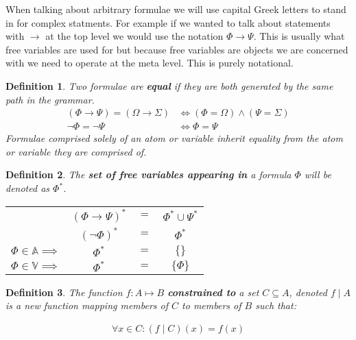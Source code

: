 \documentclass{article}
\newtheorem{defin}{Definition}
\begin{document}
When talking about arbitrary formulae we will use capital Greek letters to stand in for complex statments.
For example if we wanted to talk about statements with $\rightarrow$ at the top level we would use the notation $\Phi \rightarrow \Psi$.
This is usually what free variables are used for but because free variables are objects we are concerned with we need to operate at the meta level.
This is purely notational.

\begin{defin}
Two formulae are \textbf{equal} if they are both generated by the same path in the grammar.
\begin{align*}
(\Phi \rightarrow \Psi) = (\Omega \rightarrow \Sigma) &\iff (\Phi = \Omega) \land (\Psi = \Sigma) \\
\neg \Phi = \neg \Psi &\iff \Phi = \Psi
\end{align*}
Formulae comprised solely of an atom or variable inherit equality from the atom or variable they are comprised of.
\end{defin}

\begin{defin}
The \textbf{set of free variables appearing in} a formula $\Phi$ will be denoted as $\Phi^\ast$.
\setlength{\tabcolsep}{1pt}
\begin{center}
	\begin{tabular}{rclc}
		                               & $(\Phi \rightarrow \Psi)^\ast$ & $=$ & $ \Phi^\ast \cup \Psi^\ast$ \\
		                               & $(\neg \Phi)^\ast            $ & $=$ & $ \Phi^\ast               $ \\
		$\Phi \in \mathbb{A} \implies$ & $\Phi^\ast                   $ & $=$ & $ \{\}                    $ \\
		$\Phi \in \mathbb{V} \implies$ & $\Phi^\ast                   $ & $=$ & $ \{\Phi\}                $
	\end{tabular}
\end{center}
\end{defin}

\begin{defin}
The function $f : A \mapsto B$ \textbf{constrained to} a set $C \subseteq A$, denoted $f \mid A$ is a new function mapping
members of $C$ to members of $B$ such that:

\begin{align*}
\forall x \in C : (f \mid C) (x) = f (x)
\end{align*}
\end{defin}
\end{document}

